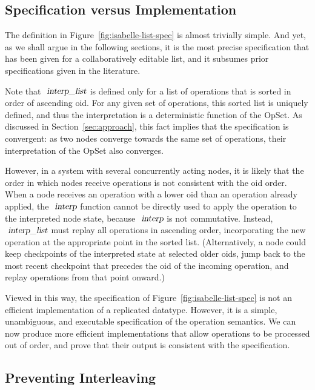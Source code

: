 \subsection{Specification versus Implementation}

The definition in Figure~\ref{fig:isabelle-list-spec} is almost trivially simple.
And yet, as we shall argue in the following sections, it is the most precise specification that has been given for a collaboratively editable list, and it subsumes prior specifications given in the literature.

Note that $\isa{interp{\isacharunderscore}list}$ is defined only for a list of operations that is sorted in order of ascending oid.
For any given set of operations, this sorted list is uniquely defined, and thus the interpretation is a deterministic function of the OpSet.
As discussed in Section~\ref{sec:approach}, this fact implies that the specification is convergent: as two nodes converge towards the same set of operations, their interpretation of the OpSet also converges.

However, in a system with several concurrently acting nodes, it is likely that the order in which nodes receive operations is not consistent with the oid order.
When a node receives an operation with a lower oid than an operation already applied, the $\isa{interp}$ function cannot be directly used to apply the operation to the interpreted node state, because $\isa{interp}$ is not commutative.
Instead, $\isa{interp{\isacharunderscore}list}$ must replay all operations in ascending order, incorporating the new operation at the appropriate point in the sorted list.
(Alternatively, a node could keep checkpoints of the interpreted state at selected older oids, jump back to the most recent checkpoint that precedes the oid of the incoming operation, and replay operations from that point onward.)

Viewed in this way, the specification of Figure~\ref{fig:isabelle-list-spec} is not an efficient implementation of a replicated datatype.
However, it is a simple, unambiguous, and executable specification of the operation semantics.
We can now produce more efficient implementations that allow operations to be processed out of order, and prove that their output is consistent with the specification.

\subsection{Preventing Interleaving}

